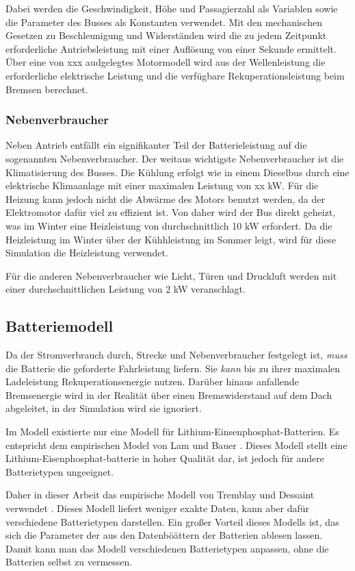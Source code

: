 Dabei werden die Geschwindigkeit, Höhe und Passagierzahl als Variablen sowie die Parameter des Busses als Konstanten verwendet. Mit den mechanischen Gesetzen zu Beschleunigung und Widerständen wird die zu jedem Zeitpunkt erforderliche Antriebsleistung mit einer Auflösung von einer Sekunde ermittelt. Über eine von xxx  audgelegtes Motormodell wird aus der Wellenleistung die erforderliche elektrische Leistung und die verfügbare Rekuperationsleistung beim Bremsen berechnet.

\subsubsection{Nebenverbraucher}
Neben Antrieb entfällt ein signifikanter Teil der Batterieleistung auf die sogenannten Nebenverbraucher. Der weitaus wichtigste Nebenverbraucher ist die Klimatisierung des Busses. Die Kühlung erfolgt wie in einem Dieselbus durch eine elektrische Klimaanlage mit einer maximalen Leistung von xx kW. Für die Heizung kann jedoch nicht die Abwärme des Motors benutzt werden, da der Elektromotor dafür viel zu effizient ist. Von daher wird der Bus direkt geheizt, was im Winter eine Heizleistung von durchschnittlich 10 kW erfordert. Da die Heizleistung im Winter über der Kühhleistung im Sommer leigt, wird für diese Simulation die Heizleistung verwendet.

Für die anderen Nebenverbraucher wie Licht, Türen und Druckluft werden mit einer durchschnittlichen Leistung von 2 kW veranschlagt.

\subsection{Batteriemodell}
Da der Stromverbrauch durch, Strecke und Nebenverbraucher festgelegt ist, \emph{muss} die Batterie die geforderte Fahrleistung liefern. Sie \emph{kann} bis zu ihrer maximalen Ladeleistung Rekuperationsenergie nutzen. Darüber hinaus anfallende Bremsenergie wird in der Realität über einen Bremswiderstand auf dem Dach abgeleitet, in der Simulation wird sie ignoriert.

Im Modell existierte nur eine Modell für Lithium-Einsenphosphat-Batterien. Es entspricht dem empirischen Model von Lam und Bauer \cite{lam2011practical}. Dieses Modell stellt eine Lithium-Eisenphosphat-batterie in hoher Qualität dar, ist jedoch für andere Batterietypen ungeeignet.

Daher in dieser Arbeit das empirische Modell von Tremblay und Dessaint verwendet \cite{tremblay2009experimental}. Dieses Modell liefert weniger exakte Daten, kann aber dafür verschiedene Batterietypen darstellen. Ein großer Vorteil dieses Modells ist, das sich die Parameter der aus den Datenböättern der Batterien ablesen lassen. Damit kann man das Modell verschiedenen Batterietypen anpassen, ohne die Batterien selbst zu vermessen.

